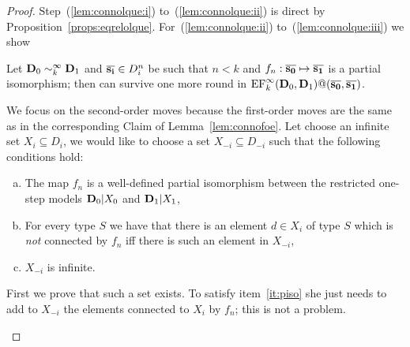 \begin{proof}
	Step~(\ref{lem:connolque:i}) to~(\ref{lem:connolque:ii}) is direct by Proposition~\ref{props:eqrelolque}. For~(\ref{lem:connolque:ii}) to~(\ref{lem:connolque:iii}) we show
	\begin{claimfirst}
	Let $\mathbf{D}_0 \sim_k^\infty \mathbf{D}_1$ and $\overline{{\mathbf{s_i}}} \in D_i^n$ be such that $n<k$ and $f_n:\overline{{\mathbf{s_0}}}\mapsto\overline{{\mathbf{s_1}}}$ is a partial isomorphism; then \eloise can survive one more round in $\mathrm{EF}_{k}^\infty(\mathbf{D}_0,\mathbf{D}_1)@(\overline{{\mathbf{s_0}}},\overline{{\mathbf{s_1}}})$.
	\end{claimfirst}
	\begin{pfclaim}
		We focus on the second-order moves because the first-order moves are the same as in the corresponding Claim of Lemma~\ref{lem:connofoe}. Let \abelard choose an infinite set $X_i \subseteq D_i$, we would like \eloise to choose a set $X_{-i} \subseteq D_{-i}$ such that the following conditions hold:
		\begin{enumerate}[(a)]
			\parskip 0pt
			\item\label{it:piso} %
			The map $f_n$ is a well-defined partial isomorphism between the restricted one-step models $\mathbf{D}_0{|}X_0$ and $\mathbf{D}_1{|}X_1$,
			\item\label{it:equiv}
			For every type $S$ we have that there is an element $d\in X_i$ of type $S$ which is \emph{not} connected by $f_n$ iff there is such an element in $X_{-i}$,
			\item\label{it:inf} $X_{-i}$ is infinite.
		\end{enumerate}
		First we prove that such a set exists. %
		To satisfy item~\eqref{it:piso} she just needs to add to $X_{-i}$ the elements connected to $X_i$ by $f_n$; this is not a problem.


\end{pfclaim}
\end{proof}
